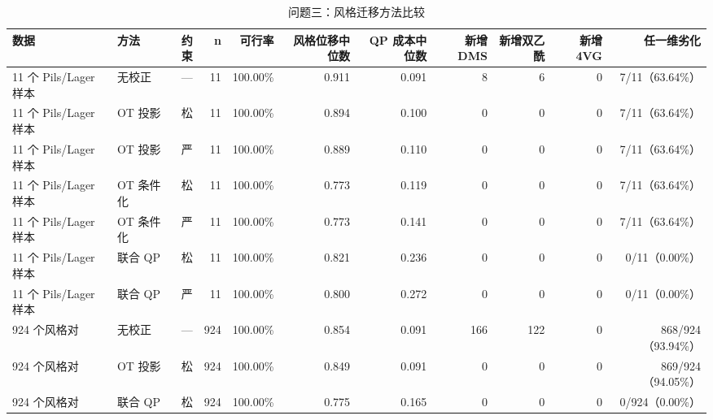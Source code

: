 \begin{table}[tbp]
\centering
\caption{问题三：风格迁移方法比较}
\label{tab:t08_q3_methods}
\footnotesize
\setlength{\tabcolsep}{3.5pt}
\begin{tabular}{llrrrrrrrrr}
\toprule
数据 & 方法 & 约束 & n & 可行率 & 风格位移中位数 & QP 成本中位数 & 新增 DMS & 新增双乙酰 & 新增 4VG & 任一维劣化 \\
\midrule
11 个 Pils/Lager 样本 & 无校正 & — & 11 & 100.00\% & 0.911 & 0.091 & 8 & 6 & 0 & 7/11（63.64\%） \\
11 个 Pils/Lager 样本 & OT 投影 & 松 & 11 & 100.00\% & 0.894 & 0.100 & 0 & 0 & 0 & 7/11（63.64\%） \\
11 个 Pils/Lager 样本 & OT 投影 & 严 & 11 & 100.00\% & 0.889 & 0.110 & 0 & 0 & 0 & 7/11（63.64\%） \\
11 个 Pils/Lager 样本 & OT 条件化 & 松 & 11 & 100.00\% & 0.773 & 0.119 & 0 & 0 & 0 & 7/11（63.64\%） \\
11 个 Pils/Lager 样本 & OT 条件化 & 严 & 11 & 100.00\% & 0.773 & 0.141 & 0 & 0 & 0 & 7/11（63.64\%） \\
11 个 Pils/Lager 样本 & 联合 QP & 松 & 11 & 100.00\% & 0.821 & 0.236 & 0 & 0 & 0 & 0/11（0.00\%） \\
11 个 Pils/Lager 样本 & 联合 QP & 严 & 11 & 100.00\% & 0.800 & 0.272 & 0 & 0 & 0 & 0/11（0.00\%） \\
924 个风格对 & 无校正 & — & 924 & 100.00\% & 0.854 & 0.091 & 166 & 122 & 0 & 868/924（93.94\%） \\
924 个风格对 & OT 投影 & 松 & 924 & 100.00\% & 0.849 & 0.091 & 0 & 0 & 0 & 869/924（94.05\%） \\
924 个风格对 & 联合 QP & 松 & 924 & 100.00\% & 0.775 & 0.165 & 0 & 0 & 0 & 0/924（0.00\%） \\
\bottomrule
\end{tabular}
\end{table}
